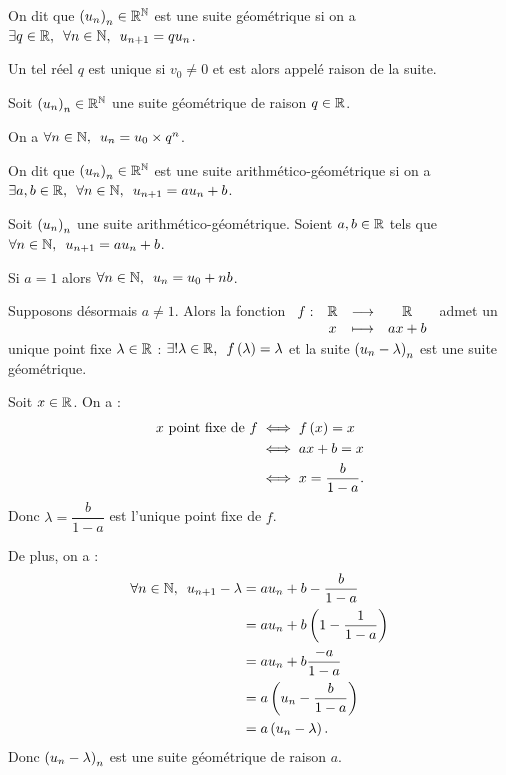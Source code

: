 \begin{defi}
On dit que \(\left(u_n\right)_n\in\mathbb{R}^{\mathbb{N}}\) est une suite géométrique si on a \(\quantifs{\exists q\in\R;\forall n\in\N}u_{n+1}=qu_n\).

Un tel réel \(q\) est unique si \(v_0\not=0\) et est alors appelé raison de la suite.
\end{defi}

\begin{prop}
Soit \(\left(u_n\right)_n\in\mathbb{R}^{\mathbb{N}}\) une suite géométrique de raison \(q\in\mathbb{R}\).

On a \(\quantifs{\forall n\in\N}u_n=u_0\times q^n\).
\end{prop}

\begin{defi}
On dit que \(\left(u_n\right)_n\in\mathbb{R}^{\mathbb{N}}\) est une suite arithmético-géométrique si on a \(\quantifs{\exists a,b\in\R;\forall n\in\N}u_{n+1}=au_n+b\).
\end{defi}

\begin{prop}
Soit \(\left(u_n\right)_n\) une suite arithmético-géométrique. Soient \(a,b\in\mathbb{R}\) tels que \(\quantifs{\forall n\in\N}u_{n+1}=au_n+b\).

Si \(a=1\) alors \(\quantifs{\forall n\in\N}u_n=u_0+nb\).

Supposons désormais \(a\not=1\). Alors la fonction \(\begin{array}[t]{cccc}f : & \mathbb{R} & \longrightarrow & \mathbb{R} \\ & x & \longmapsto & ax+b\end{array}\) admet un unique point fixe \(\lambda\in\mathbb{R}\) : \(\quantifs{\exists!\lambda\in\R}f\paren{\lambda}=\lambda\) et la suite \(\left(u_n-\lambda\right)_n\) est une suite géométrique.
\end{prop}

\begin{dem}
Soit \(x\in\mathbb{R}\). On a : \[\begin{aligned}
x\text{ point fixe de }f&\iff f\left(x\right)=x \\
&\iff ax+b=x \\
&\iff x=\dfrac{b}{1-a}.
\end{aligned}\] Donc \(\lambda=\dfrac{b}{1-a}\) est l'unique point fixe de \(f\).

De plus, on a : \[\begin{aligned}
\quantifs{\forall n\in\N}u_{n+1}-\lambda&=au_n+b-\dfrac{b}{1-a} \\
&=au_n+b\paren{1-\dfrac{1}{1-a}} \\
&=au_n+b\dfrac{-a}{1-a} \\
&=a\paren{u_n-\dfrac{b}{1-a}} \\
&=a\paren{u_n-\lambda}.
\end{aligned}\] Donc \(\left(u_n-\lambda\right)_n\) est une suite géométrique de raison \(a\).
\end{dem}

